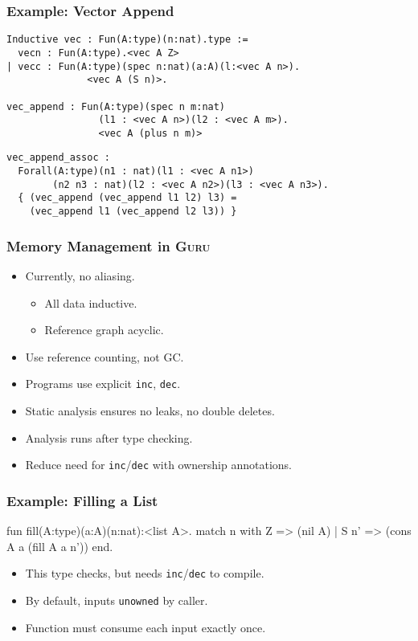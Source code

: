 \documentclass[11pt]{beamer}
\begin{document}
\begin{frame}[containsverbatim]
\frametitle{Example: Vector Append}
\footnotesize
\begin{verbatim}
Inductive vec : Fun(A:type)(n:nat).type :=
  vecn : Fun(A:type).<vec A Z>
| vecc : Fun(A:type)(spec n:nat)(a:A)(l:<vec A n>).
              <vec A (S n)>.

vec_append : Fun(A:type)(spec n m:nat)
                (l1 : <vec A n>)(l2 : <vec A m>).
                <vec A (plus n m)>
\end{verbatim}


\begin{verbatim}
vec_append_assoc : 
  Forall(A:type)(n1 : nat)(l1 : <vec A n1>)
        (n2 n3 : nat)(l2 : <vec A n2>)(l3 : <vec A n3>).
  { (vec_append (vec_append l1 l2) l3) =
    (vec_append l1 (vec_append l2 l3)) }

\end{verbatim}

\end{frame}

\begin{frame}
\frametitle{Memory Management in \textsc{Guru}}

\begin{itemize}
\item Currently, no aliasing.
\begin{itemize}
\item All data inductive.
\item Reference graph acyclic.
\end{itemize}
\item Use reference counting, not GC.
\item Programs use explicit \texttt{inc}, \texttt{dec}.
\item Static analysis ensures no leaks, no double deletes.
\item Analysis runs after type checking.
\item Reduce need for \texttt{inc}/\texttt{dec} with ownership annotations.
\end{itemize}

\end{frame}

\begin{frame}[containsverbatim]
\frametitle{Example: Filling a List}
\begin{code}
fun fill(A:type)(a:A)(n:nat):<list A>.
  match n with
    Z => (nil A)
  | S n' => (cons A a (fill A a n'))
  end.
\end{code}

\begin{itemize}
\item This type checks, but needs \texttt{inc}/\texttt{dec} to compile.
\item By default, inputs \texttt{unowned} by caller.
\item Function must consume each input exactly once.
\end{itemize}
\end{frame}
\end{document}
